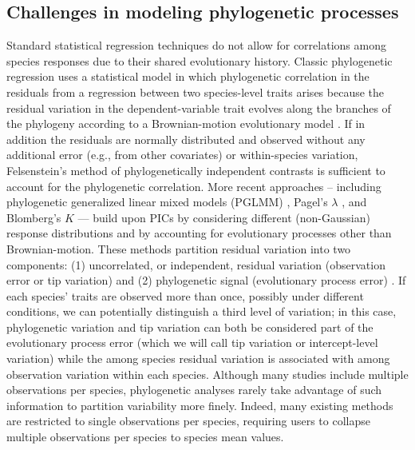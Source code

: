 \documentclass[12pt]{article}
\begin{document}
\subsection*{Challenges in modeling phylogenetic processes}

Standard statistical regression techniques do not allow for correlations among species responses due to their shared evolutionary history.
Classic phylogenetic regression uses a statistical model in which phylogenetic correlation in the residuals from a regression between two species-level traits arises because the residual variation in the dependent-variable trait evolves along the branches of the phylogeny according to a Brownian-motion evolutionary model \citep{felsenstein1985phylogenies}. 
If in addition the residuals are normally distributed and observed without any additional error (e.g., from other covariates) or within-species variation, Felsenstein's method of phylogenetically independent contrasts  \citep[PICS:][]{felsenstein1985phylogenies, nicolakakis2000forebrain} is sufficient to account for the phylogenetic correlation.
More recent approaches -- including phylogenetic generalized linear mixed models (PGLMM) \citep{ives2011generalized, housworth2004phylogenetic}, Pagel's $\lambda$ \citep{pagel1999inferring}, and Blomberg's $K$ \citep{blomberg2003testing} --- build upon PICs by considering different (non-Gaussian) response distributions and by accounting for evolutionary processes other than Brownian-motion. 
These methods partition residual variation into two components: (1) uncorrelated, or independent, residual variation (observation error or tip variation) and (2) phylogenetic signal (evolutionary process error) \citep{hansen2012interpreting, housworth2004phylogenetic}.
If each species' traits are observed more than once, possibly under different conditions, we can potentially distinguish a third level of variation; in this case, phylogenetic variation and tip variation can both be considered part of the evolutionary process error (which we will call tip variation or intercept-level variation) while the among species residual variation is associated with among observation variation within each species.
Although many studies include multiple observations per species, phylogenetic analyses rarely take advantage of such information to partition variability more finely.
Indeed, many existing methods are restricted to single observations per species, requiring users to collapse multiple observations per species to species mean values.
\end{document}
